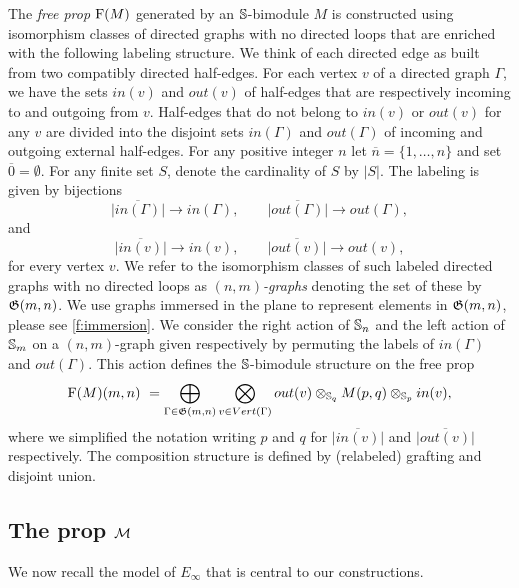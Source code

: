The \textit{free prop} $\operatorname{F}(M)$ generated by an $\mathbb{S}$-bimodule $M$ is constructed using isomorphism classes of directed graphs with no directed loops that are enriched with the following labeling structure.
We think of each directed edge as built from two compatibly directed half-edges.
For each vertex $v$ of a directed graph $\Gamma$, we have the sets $in(v)$ and $out(v)$ of half-edges that are respectively incoming to and outgoing from $v$.
Half-edges that do not belong to $in(v)$ or $out(v)$ for any $v$ are divided into the disjoint sets $in(\Gamma)$ and $out(\Gamma)$ of incoming and outgoing external half-edges.
For any positive integer $n$ let $\overline{n} = \{1, \dots, n\}$ and set $\overline{0} = \emptyset$.
For any finite set $S$, denote the cardinality of $S$ by $|S|$.
The labeling is given by bijections
\[
\overline{|in(\Gamma)|}\to in(\Gamma), \qquad
\overline{|out(\Gamma)|}\to out(\Gamma),
\]
and
\[
\overline{|in(v)|}\to in(v), \qquad
\overline{|out(v)|}\to out(v),
\]
for every vertex $v$.
We refer to the isomorphism classes of such labeled directed graphs with no directed loops as $(n,m)$\textit{-graphs} denoting the set of these by $\mathfrak{G}(m,n)$.
We use graphs immersed in the plane to represent elements in $\mathfrak{G}(m,n)$, please see \cref{f:immersion}.
We consider the right action of $\mathbb{S}_n$ and the left action of $\mathbb{S}_m$ on a $(n,m)$-graph given respectively by permuting the labels of $in(\Gamma)$ and $out(\Gamma)$.
This action defines the $\mathbb{S}$-bimodule structure on the free prop
\begin{equation} \label{e:free prop}
\operatorname{F}(M)(m,n) \ = \bigoplus_{\Gamma \in \mathfrak{G}(m,n)} \bigotimes_{v \in Vert(\Gamma)} out(v) \otimes_{\mathbb{S}_q} M(p, q) \otimes_{\mathbb{S}_p} in(v),
\end{equation}
where we simplified the notation writing $p$ and $q$ for $\overline{|in(v)|}$ and $\overline{|out(v)|}$ respectively.
The composition structure is defined by (relabeled) grafting and disjoint union.

\subsection{The prop $\mathcal{M}$}

We now recall the model of $E_\infty$ that is central to our constructions.

